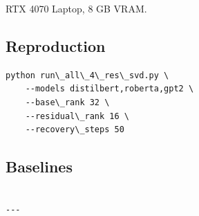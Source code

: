 RTX 4070 Laptop, 8 GB VRAM.

\subsection{Reproduction}

\begin{lstlisting}
python run\_all\_4\_res\_svd.py \
    --models distilbert,roberta,gpt2 \
    --base\_rank 32 \
    --residual\_rank 16 \
    --recovery\_steps 50
\end{lstlisting}

\subsection{Baselines}

\begin{lstlisting}

---
\end{lstlisting}